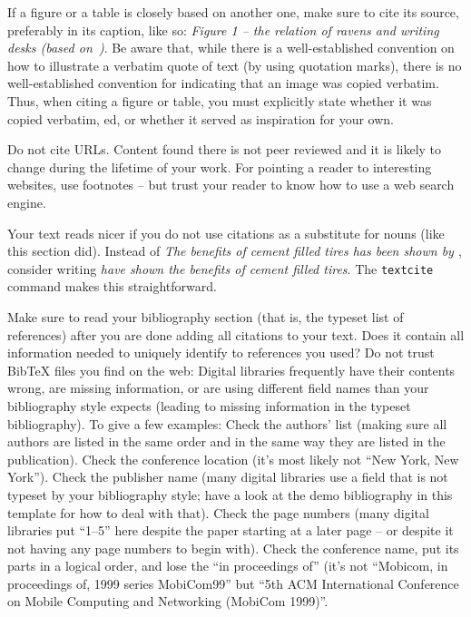 \documentclass[]{ccs-thesis}
\begin{document}
If a figure or a table is closely based on another one, make sure to cite its source, preferably in its caption, like so:
\emph{Figure 1 -- the relation of ravens and writing desks (based on~\cite[Figure~42]{dietrich2009lifetime})}.
Be aware that, while there is a well-established convention on how to illustrate a verbatim quote of text (by using quotation marks), there is no well-established convention for indicating that an image was copied verbatim.
Thus, when citing a figure or table, you must explicitly state whether it was copied verbatim, ed, or whether it served as inspiration for your own.

Do not cite URLs. Content found there is not peer reviewed and it is likely to change during the lifetime of your work.
For pointing a reader to interesting websites, use footnotes -- but trust your reader to know how to use a web search engine.

Your text reads nicer if you do not use citations as a substitute for nouns (like this section did).
Instead of \emph{The benefits of cement filled tires has been shown by \cite{akyildiz2002survey}}, consider writing \emph{\textcite{akyildiz2002survey} have shown the benefits of cement filled tires}.
The \texttt{textcite} command makes this straightforward.

Make sure to read your bibliography section (that is, the typeset list of references) after you are done adding all citations to your text.
Does it contain all information needed to uniquely identify to references you used?
Do not trust BibTeX files you find on the web:
Digital libraries frequently have their contents wrong, are missing information, or are using different field names than your bibliography style expects (leading to missing information in the typeset bibliography).
To give a few examples:
Check the authors' list (making sure all authors are listed in the same order and in the same way they are listed in the publication).
Check the conference location (it's most likely not ``New York, New York'').
Check the publisher name (many digital libraries use a field that is not typeset by your bibliography style; have a look at the demo bibliography in this template for how to deal with that).
Check the page numbers (many digital libraries put ``1--5'' here despite the paper starting at a later page -- or despite it not having any page numbers to begin with).
Check the conference name, put its parts in a logical order, and lose the ``in proceedings of'' (it's not ``Mobicom, in proceedings of, 1999 series MobiCom99'' but ``5th ACM International Conference on Mobile Computing and Networking (MobiCom 1999)''.
\end{document}

